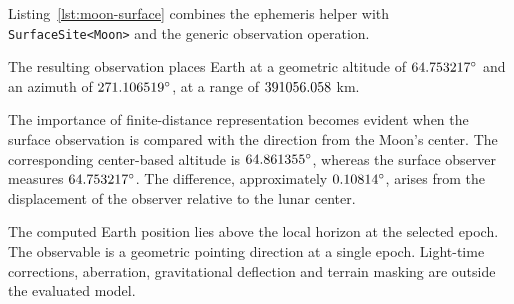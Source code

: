 Listing~\ref{lst:moon-surface} combines the ephemeris helper with \texttt{SurfaceSite<Moon>} and
the generic observation operation.



The resulting observation places Earth at a geometric altitude of $64.753217^\circ$ and an
azimuth of $271.106519^\circ$, at a range of $391056.058$ km.

The importance of finite-distance representation becomes evident when the surface observation is
compared with the direction from the Moon's center. The corresponding center-based altitude is
$64.861355^\circ$, whereas the surface observer measures $64.753217^\circ$. The
difference, approximately $0.10814^\circ$, arises from the displacement of the observer
relative to the lunar center.

The computed Earth position lies above the local horizon at the selected epoch. The observable is a
geometric pointing direction at a single epoch. Light-time corrections, aberration, gravitational
deflection and terrain masking are outside the evaluated model.
